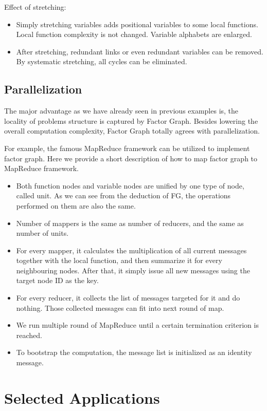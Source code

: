 Effect of stretching:
\begin{itemize}
	\item Simply stretching variables adds positional variables to some local functions.
	Local function complexity is not changed. Variable alphabets are enlarged. 
	\item After stretching, redundant links or even redundant variables can be removed. 
	By systematic stretching, all cycles can be eliminated. 
\end{itemize}

\subsection{Parallelization}

The major advantage as we have already seen in previous examples
is, the locality of problems structure is captured by Factor Graph. 
Besides lowering the overall computation complexity, Factor Graph 
totally agrees with parallelization. 

For example, the famous MapReduce framework can be utilized 
to implement factor graph. Here we provide a short description 
of how to map factor graph to MapReduce framework. 
\begin{itemize}
	\item Both function nodes and variable nodes are unified 
	by one type of node, called unit. As we can see from the deduction 
	of FG, the operations performed on them are also the same. 
	\item Number of mappers is the same as number of reducers, 
	and the same as number of units.
	\item For every mapper, it calculates the multiplication of 
	all current messages together with the local function, and then 
	summarize it for every neighbouring nodes. After that, 
	it simply issue all new messages using the target node ID as the key. 
	\item For every reducer, it collects the list of messages targeted 
	for it and do nothing. Those collected messages can fit into 
	next round of map. 
	\item We run multiple round of MapReduce until a certain termination 
	criterion is reached. 
	\item To bootstrap the computation, the message list is initialized 
	as an identity message. 
\end{itemize}


\section{Selected Applications}

